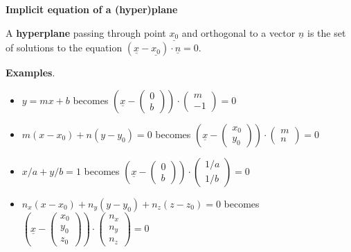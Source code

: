 \documentclass[12pt,letterpaper,noanswers]{exam}
\newcommand{\mb}[1]{\underline{#1}}
\begin{document}
\noindent\textbf{Implicit equation of a (hyper)plane}

\begin{tcolorbox}
A \textbf{hyperplane} passing through point $\mb{x_0}$ and orthogonal to a vector $\mb{n}$ is the set of solutions to the equation $(\mb{x}-\mb{x_0})\cdot\mb{n} = 0$.
\end{tcolorbox}

\noindent\textbf{Examples}.

\begin{itemize}
\itemsep0em
    \item $y = mx + b$ becomes $\left(\mb{x}-\left(\begin{array}{c}0 \\ b\end{array}\right)\right)\cdot \left(\begin{array}{c}m \\ -1\end{array}\right) = 0$
    \item $m(x-x_0)+n(y-y_0) = 0$ becomes $\left(\mb{x}-\left(\begin{array}{c}x_0 \\ y_0\end{array}\right)\right)\cdot \left(\begin{array}{c}m \\ n\end{array}\right) = 0$
    \item $x/a + y/b = 1$ becomes $\left(\mb{x}-\left(\begin{array}{c}0 \\ b\end{array}\right)\right)\cdot \left(\begin{array}{c}1/a \\ 1/b\end{array}\right) = 0$
\item $n_x(x-x_0)+n_y(y-y_0) +n_z(z-z_0)= 0$ becomes $\left(\mb{x}-\left(\begin{array}{c}x_0 \\ y_0 \\ z_0 \end{array}\right)\right)\cdot \left(\begin{array}{c}n_x \\ n_y \\ n_z\end{array}\right) = 0$

\end{itemize}
\end{document}
